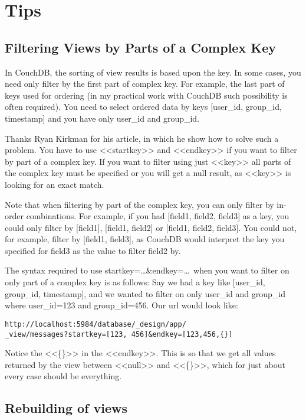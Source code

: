 \section{Tips}

\subsection{Filtering Views by Parts of a Complex Key}

In CouchDB, the sorting of view results is based upon the key. In some cases, you need only filter by the first part of complex key. For example, the last part of keys used for ordering (in my practical work with CouchDB such possibility is often required). You need to select ordered data by keys [user\_id, group\_id, timestamp] and you have only user\_id and group\_id.

Thanks Ryan Kirkman for his article\cite{couchdb_filtering_views}, in which he show how to solve such a problem. You have to use <<startkey>> and <<endkey>> if you want to filter by part of a complex key. If you want to filter using just <<key>> all parts of the complex key must be specified or you will get a null result, as <<key>> is looking for an exact match.

Note that when filtering by part of the complex key, you can only filter by in-order combinations. For example, if you had [field1, field2, field3] as a key, you could only filter by [field1], [field1, field2] or [field1, field2, field3]. You could not, for example, filter by [field1, field3], as CouchDB would interpret the key you specified for field3 as the value to filter field2 by.

The syntax required to use startkey=\dots\&endkey=\dots~when you want to filter on only part of a complex key is as follows:
Say we had a key like [user\_id, group\_id, timestamp], and we wanted to filter on only user\_id and group\_id where user\_id=123 and group\_id=456. Our url would look like:

\begin{lstlisting}
http://localhost:5984/database/_design/app/
_view/messages?startkey=[123, 456]&endkey=[123,456,{}]
\end{lstlisting}

Notice the <<\{\}>> in the <<endkey>>. This is so that we get all values returned by the view between <<null>> and <<\{\}>>, which for just about every case should be everything.

\subsection{Rebuilding of views}

